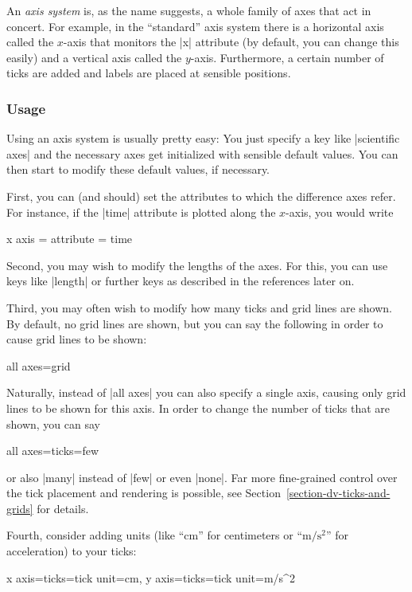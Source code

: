 An \emph{axis system} is, as the name suggests, a whole family of axes
that act in concert. For example, in the ``standard'' axis system there
is a horizontal axis called the $x$-axis that monitors the |x|
attribute (by default, you can change this easily) and a vertical axis
called the $y$-axis. Furthermore, a certain number of ticks are added
and labels are placed at sensible positions.

\subsubsection{Usage}

Using an axis system is usually pretty easy: You just specify a key
like |scientific axes| and the necessary axes get initialized with
sensible default values. You can then start to modify these default
values, if necessary.

First, you can (and should) set the attributes to which the difference 
axes refer. For instance, if the |time| attribute is plotted along the
$x$-axis, you would write
\begin{codeexample}
x axis = {attribute = time}
\end{codeexample}

Second, you may wish to modify the lengths of the axes. For this, you
can use keys like |length| or further keys as described in the
references later on.

Third, you may often wish to modify how many ticks and grid lines are
shown. By default, no grid lines are shown, but you can say the
following in order to cause grid lines to be shown:
\begin{codeexample}
all axes={grid}
\end{codeexample}
Naturally, instead of |all axes| you can also specify a single axis,
causing only grid lines to be shown for this axis.
In order to change the number of ticks that are shown, you can say
\begin{codeexample}
all axes={ticks=few}  
\end{codeexample}
or also |many| instead of |few| or even |none|. Far more fine-grained
control over the tick placement and rendering is possible, 
see Section~\ref{section-dv-ticks-and-grids} for details.

Fourth, consider adding units (like ``cm'' for centimeters or
``$\mathrm m/\mathrm s^2$'' for acceleration) to your ticks:
\begin{codeexample}
x axis={ticks={tick unit=cm}}, y axis={ticks={tick unit=m/s^2}}  
\end{codeexample}



